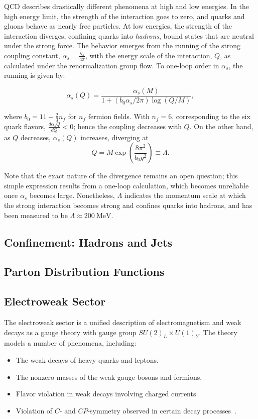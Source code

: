 QCD describes drastically different phenomena at high and low energies. In the high energy limit, the strength of the interaction goes to zero, and quarks and gluons behave as nearly free particles. At low energies, the strength of the interaction diverges, confining quarks into \emph{hadrons}, bound states that are neutral under the strong force. The behavior emerges from the running of the strong coupling constant, $\alpha_s = \frac{g_s}{4\pi}$, with the energy scale of the interaction, $Q$, as calculated under the renormalization group flow. To one-loop order in $\alpha_s$, the running is given by:

\begin{equation}
\alpha_s(Q) = \frac{\alpha_s(M)}{1 + (b_0 \alpha_s/2\pi)\log(Q/M)},
\end{equation}

where $b_0=11-\frac{2}{3}n_f$ for $n_f$ fermion fields. With $n_f=6$, corresponding to the six quark flavors, $\frac{d\alpha_s{Q}}{dQ}<0$; hence the coupling decreases with $Q$. On the other hand, as $Q$ decreases, $\alpha_s(Q)$ increases, diverging at
\begin{equation}
Q=M\exp\left(\frac{8\pi^2}{b_0g^2}\right) \equiv \Lambda.
\end{equation}

Note that the exact nature of the divergence remains an open question; this simple expression results from a one-loop calculation, which becomes unreliable once $\alpha_s$ becomes large. Nonetheless, $\Lambda$ indicates the momentum scale at which the strong interaction becomes strong and confines quarks into hadrons, and has been measured to be $\Lambda \approx 200~\mbox{MeV}$. 

\subsection{Confinement: Hadrons and Jets}

\subsection{Parton Distribution Functions} 


\subsection{Electroweak Sector}
The electroweak sector is a unified description of electromagnetism and weak decays as a gauge theory with gauge group $SU(2)_L\times U(1)_Y$. The theory models a number of phenomena, including:
\begin{itemize}
	\item The weak decays of heavy quarks and leptons.
	\item The nonzero masses of the weak gauge bosons and fermions.
	\item Flavor violation in weak decays involving charged currents.
	\item Violation of $C$- and $CP$-symmetry observed in certain decay processes~\cite{Cviolation, cronin, na31, CP-bmesons}.
\end{itemize}

